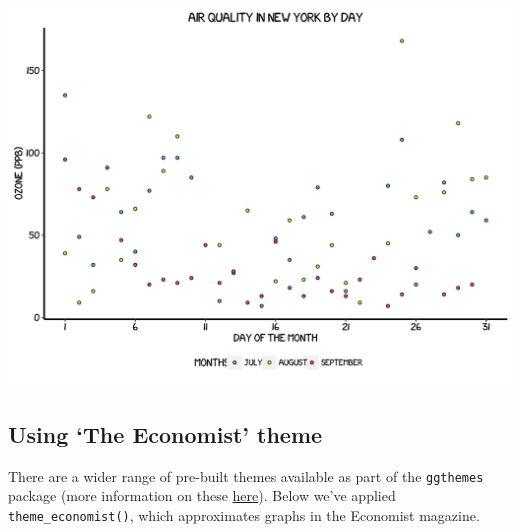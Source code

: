 \documentclass[]{article}
\begin{document}
\begin{center}\includegraphics{0_all_posts_pdf/scatter_13-1} \end{center}

\subsection{\texorpdfstring{Using `The Economist'
theme}{Using The Economist theme}}\label{using-the-economist-theme-4}

There are a wider range of pre-built themes available as part of the
\texttt{ggthemes} package (more information on these
\href{https://cran.r-project.org/web/packages/ggthemes/vignettes/ggthemes.html}{here}).
Below we've applied \texttt{theme\_economist()}, which approximates
graphs in the Economist magazine.
\end{document}
